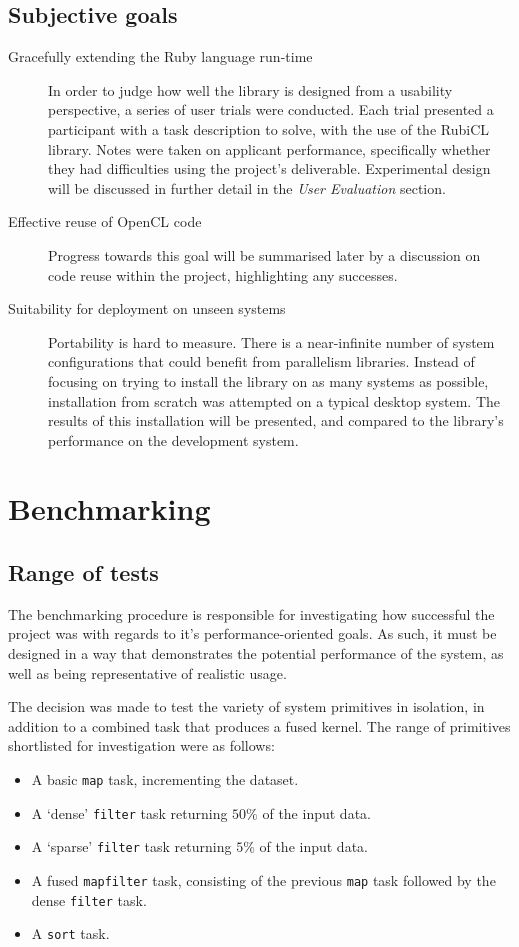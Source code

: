 \subsection{Subjective goals}
\begin{description}
\item[Gracefully extending the Ruby language run-time]
In order to judge how well the library is designed from a usability perspective, a series of user trials were conducted.
Each trial presented a participant with a task description to solve, with the use of the RubiCL library.
Notes were taken on applicant performance, specifically whether they had difficulties using the project's deliverable.
Experimental design will be discussed in further detail in the \emph{User Evaluation} section.
\item[Effective reuse of \ac{OpenCL} code]
Progress towards this goal will be summarised later  by a discussion on code reuse within the project, highlighting any successes. 
\item[Suitability for deployment on unseen systems]
Portability is hard to measure. There is a near-infinite number of system configurations that could benefit from parallelism libraries. Instead of focusing on trying to install the library on as many systems as possible, installation from scratch was attempted on a typical desktop system. The results of this installation will be presented, and compared to the library's performance on the development system.
\end{description}

\section{Benchmarking}
\subsection{Range of tests}
The benchmarking procedure is responsible for investigating how successful the project was with regards to it's performance-oriented goals.
As such, it must be designed in a way that demonstrates the potential performance of the system, as well as being representative of realistic usage.

The decision was made to test the variety of system primitives in isolation, in addition to a combined task that produces a fused kernel.
The range of primitives shortlisted for investigation were as follows:
\begin{itemize}
  \item A basic \verb|map| task, incrementing the dataset.
  \item A `dense' \verb|filter| task returning $50\%$ of the input data.
  \item A `sparse' \verb|filter| task returning $5\%$ of the input data.
  \item A fused \verb|mapfilter| task, consisting of the previous \verb|map| task followed by the dense \verb|filter| task.
  \item A \verb|sort| task.
\end{itemize}

